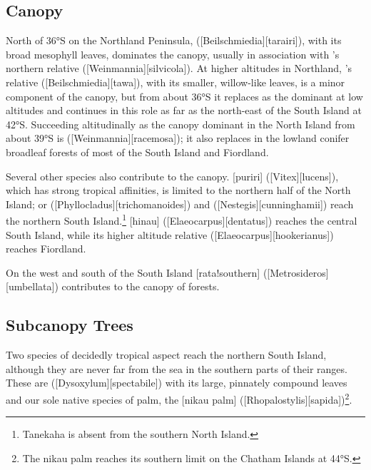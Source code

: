 \subsection{Canopy}

North of \ang{36}S on the Northland Peninsula,  ([Beilschmiedia][tarairi]), with its broad mesophyll leaves, dominates the canopy, usually in association with 's northern relative  ([Weinmannia][silvicola]).
At higher altitudes in Northland, 's relative  ([Beilschmiedia][tawa]), with its smaller, willow-like leaves, is a minor component of the canopy, but from about \ang{36}S it replaces  as the dominant at low altitudes and continues in this role as far as the north-east of the South Island at \ang{42}S.
Succeeding  altitudinally as the canopy dominant in the North Island from about \ang{39}S is  ([Weinmannia][racemosa]); it also replaces  in the lowland conifer broadleaf forests of most of the South Island and Fiordland.

Several other species also contribute to the canopy.
[puriri] ([Vitex][lucens]), which has strong tropical affinities, is limited to the northern half of the North Island;  or  ([Phyllocladus][trichomanoides]) and  ([Nestegis][cunninghamii]) reach the northern South Island.\footnote{Tanekaha is absent from the southern North Island.}
[hinau] ([Elaeocarpus][dentatus]) reaches the central South Island, while its higher altitude relative  ([Elaeocarpus][hookerianus]) reaches Fiordland.

On the west and south of the South Island [rata!southern] ([Metrosideros][umbellata]) contributes to the canopy of  forests.

\subsection{Subcanopy Trees}

Two species of decidedly tropical aspect reach the northern South Island, although they are never far from the sea in the southern parts of their ranges.
These are  ([Dysoxylum][spectabile]) with its large, pinnately compound leaves and our sole native species of palm, the [nikau palm] ([Rhopalostylis][sapida])\footnote{The nikau palm reaches its southern limit on the Chatham Islands at \ang{44}S.}.

